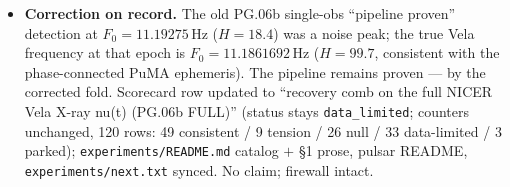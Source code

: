\documentclass[11pt]{article}
\begin{document}
\begin{itemize}[leftmargin=1.5em]
usable obs 3.4\,d / 7\,d post-glitch); next decider: $<$3-d post-glitch X-ray observations of a future Vela
glitch (eXTP class).
\item \textbf{Correction on record.} The old PG.06b single-obs ``pipeline proven'' detection at
$F_0=11.19275$\,Hz ($H=18.4$) was a noise peak; the true Vela frequency at that epoch is
$F_0=11.1861692$\,Hz ($H=99.7$, consistent with the phase-connected PuMA ephemeris). The pipeline remains
proven --- by the corrected fold. Scorecard row updated to ``recovery comb on the full NICER Vela X-ray
nu(t) (PG.06b FULL)'' (status stays \texttt{data\_limited}; counters unchanged, 120 rows: 49 consistent / 9
tension / 26 null / 33 data-limited / 3 parked); \texttt{experiments/README.md} catalog $+$ \S1 prose,
pulsar README, \texttt{experiments/next.txt} synced. No claim; firewall intact.
\end{itemize}
\end{document}
